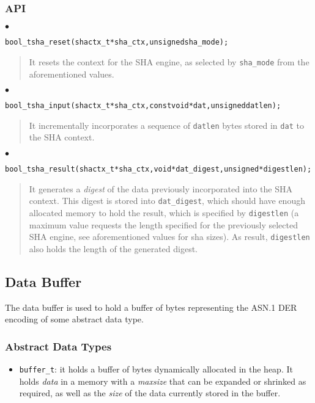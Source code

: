 \documentclass[a4paper]{article}
\newenvironment{api}%
{\noindent$\bullet$\hfill\begin{minipage}[t]{0.97\linewidth}\footnotesize\begin{alltt}}%
{\end{alltt}\end{minipage}}%
\begin{document}
\subsubsection*{API}
\begin{api}
bool_t sha_reset(shactx_t* sha_ctx, unsigned sha_mode);
\end{api}
\begin{quote}\footnotesize
It resets the context for the SHA engine, as selected by
\verb|sha_mode| from the aforementioned values.
\end{quote}
\begin{api}
bool_t sha_input(shactx_t* sha_ctx, const void* dat, unsigned datlen);
\end{api}
\begin{quote}\footnotesize
It incrementally incorporates a sequence of \verb|datlen| bytes stored
in \verb|dat| to the SHA context.
\end{quote}
\begin{api}
bool_t sha_result(shactx_t* sha_ctx, void* dat_digest, unsigned* digestlen);
\end{api}
\begin{quote}\footnotesize
It generates a \emph{digest} of the data previously incorporated into
the SHA context. This digest is stored into \verb|dat_digest|, which
should have enough allocated memory to hold the result, which is
specified by \verb|digestlen| (a maximum value requests the length
specified for the previously selected SHA engine, see aforementioned
values for sha sizes). As result, \verb|digestlen| also holds the
length of the generated digest.
\end{quote}

\subsection{Data Buffer}

The data buffer is used to hold a buffer of bytes representing the
ASN.1 DER encoding of some abstract data type.

\subsubsection*{Abstract Data Types}
\begin{itemize}\small
\item \verb|buffer_t|: it holds a buffer of bytes dynamically
  allocated in the heap. It holds \emph{data} in a memory with a
  \emph{maxsize} that can be expanded or shrinked as required, as well
  as the \emph{size} of the data currently stored in the buffer.
\end{itemize}
\end{document}
